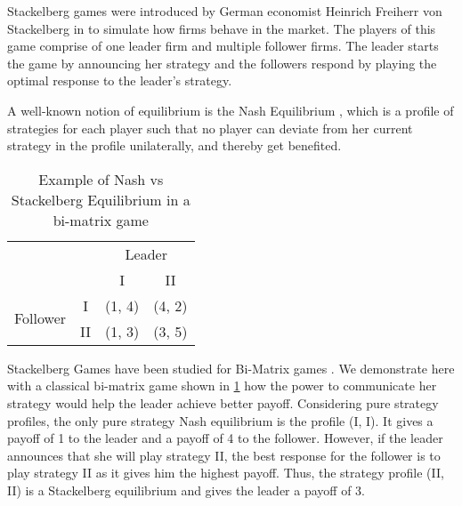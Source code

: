 
Stackelberg games were introduced by German economist Heinrich Freiherr von Stackelberg in \cite{S34} to simulate how firms behave in the market. The players of this game comprise of one leader firm and multiple follower firms. The leader starts the game by announcing her strategy and the followers respond by playing the optimal response to the leader's strategy.

A well-known notion of equilibrium is the Nash Equilibrium \cite{Nash50}, which is a profile of strategies for each player such that no player can deviate from her current strategy in the profile unilaterally, and thereby get benefited.

\begin{table}[]
    \centering
    \begin{tabular}{ll|c|c|}
        \cline{3-4}
        & & \multicolumn{2}{c|}{Leader} \\ 
        \cline{3-4} 
        & & I & II \\ 
        \hline
        \multicolumn{1}{|c|}{\multirow{2}{*}{Follower}} & \multicolumn{1}{c|}{I}  & (1, 4) & (4, 2)\\ 
        \cline{2-4} 
        \multicolumn{1}{|c|}{} & \multicolumn{1}{c|}{II} & (1, 3) & (3, 5) \\
        \hline
    \end{tabular}
    \caption{Example of Nash vs Stackelberg Equilibrium in a bi-matrix game}
    \label{tab:bi-matrix-game}
\end{table}

Stackelberg Games have been studied for Bi-Matrix games \cite{GS18}. We demonstrate here with a classical bi-matrix game shown in \cref{tab:bi-matrix-game} how the power to communicate her strategy would help the leader achieve better payoff. Considering pure strategy profiles, the only pure strategy Nash equilibrium is the profile (I, I). It gives a payoff of 1 to the leader and a payoff of 4 to the follower. However, if the leader announces that she will play strategy II, the best response for the follower is to play strategy II as it gives him the highest payoff. Thus, the strategy profile (II, II) is a Stackelberg equilibrium and gives the leader a payoff of 3.

